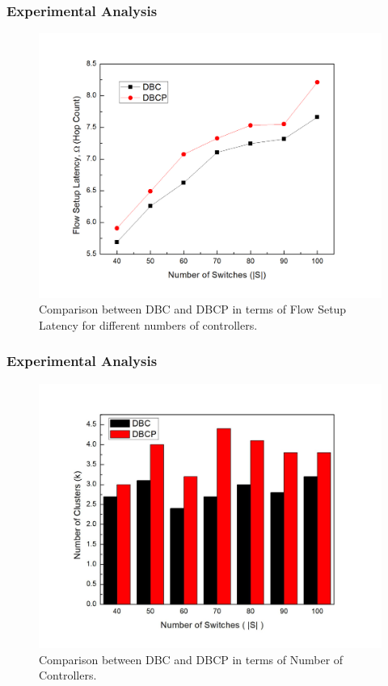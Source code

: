 \documentclass{beamer}
\begin{document}
\begin{frame}
\frametitle{Experimental Analysis}
\begin{figure}
	\includegraphics[width=0.8\linewidth]{Figures/dbc_vs_dbcp2.jpg}
	\caption{Comparison between DBC and DBCP in terms of Flow Setup Latency for different numbers of controllers.}
\end{figure}
\end{frame}

\begin{frame}
\frametitle{Experimental Analysis}
\begin{figure}
	\includegraphics[width=0.8\linewidth]{Figures/bar.jpg}
	\caption{Comparison between DBC and DBCP in terms of Number of Controllers.}
\end{figure}
\end{frame}
\end{document}
